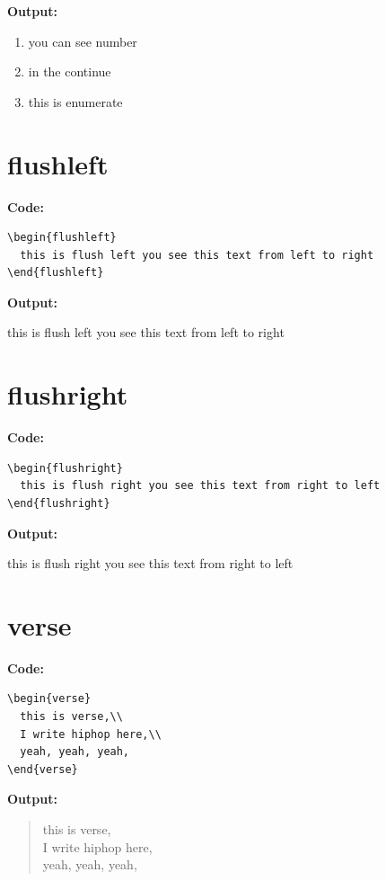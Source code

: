 \documentclass{book}
\newcommand{\myc}{\noindent\textbf{{\color{blue} Code}:}}
\newcommand{\myo}{\noindent\textbf{{\color{blue} Output}:\\}}
\begin{document}
\myo
\begin{enumerate}
  \item you can see number
  \item in the continue
  \item this is enumerate
\end{enumerate}

\section{flushleft}
\myc
\begin{lstlisting}
\begin{flushleft}
  this is flush left you see this text from left to right
\end{flushleft}
\end{lstlisting}

\myo
\begin{flushleft}
  this is flush left you see this text from left to right
\end{flushleft}

\section{flushright}
\myc
\begin{lstlisting}
\begin{flushright}
  this is flush right you see this text from right to left
\end{flushright}
\end{lstlisting}

\myo
\begin{flushright}
  this is flush right you see this text from right to left
\end{flushright}

\section{verse}
\myc
\begin{lstlisting}
\begin{verse}
  this is verse,\\
  I write hiphop here,\\
  yeah, yeah, yeah,
\end{verse}
\end{lstlisting}

\myo
\begin{verse}
  this is verse,\\
  I write hiphop here,\\
  yeah, yeah, yeah,
\end{verse}
\end{document}
